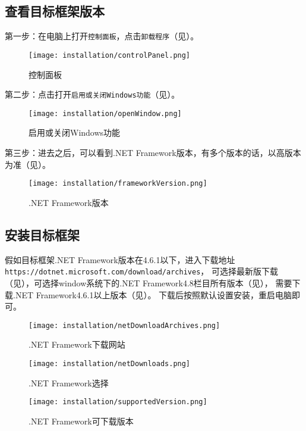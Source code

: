 \subsection{查看目标框架版本}
第一步：在电脑上打开\lstinline{控制面板}，点击\lstinline{卸载程序}（见）。
\begin{figure}[htbp]
    \centering
    \texttt{[image: installation/controlPanel.png]}
    \caption{ 控制面板 \label{fig:controlPanel}}
\end{figure}
第二步：点击打开\lstinline{启用或关闭Windows功能}（见）。
\begin{figure}[htbp]
    \centering
    \texttt{[image: installation/openWindow.png]}
    \caption{ 启用或关闭Windows功能 \label{fig:openWindow}}
\end{figure}
第三步：进去之后，可以看到.NET Framework版本，有多个版本的话，以高版本为准（见）。
\begin{figure}[htbp]
    \centering
    \texttt{[image: installation/frameworkVersion.png]}
    \caption{ .NET Framework版本 \label{fig:frameworkVersion}}
\end{figure}

\subsection{安装目标框架}
假如目标框架.NET Framework版本在4.6.1以下，进入下载地址\lstinline{https://dotnet.microsoft.com/download/archives}，
可选择最新版下载（见），可选择window系统下的.NET Framework4.8栏目所有版本（见），
需要下载.NET Framework4.6.1以上版本（见）。
下载后按照默认设置安装，重启电脑即可。
\begin{figure}[htbp]
    \centering
    \texttt{[image: installation/netDownloadArchives.png]}
    \caption{ .NET Framework下载网站 \label{fig:netDownloadArchives}}
\end{figure}
\begin{figure}[htbp]
    \centering
    \texttt{[image: installation/netDownloads.png]}
    \caption{ .NET Framework选择 \label{fig:netDownloads}}
\end{figure}
\begin{figure}[htbp]
    \centering
    \texttt{[image: installation/supportedVersion.png]}
    \caption{ .NET Framework可下载版本 \label{fig:supportedVersion}}
\end{figure}

